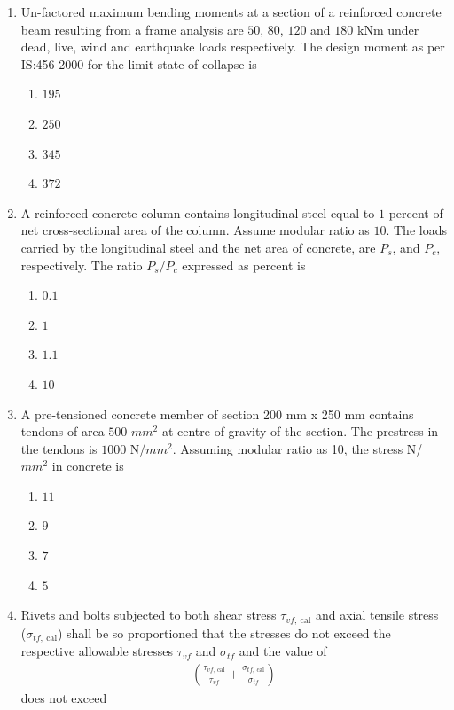 \documentclass[journal]{IEEEtran}
\begin{document}
\begin{enumerate}
\item Un-factored maximum bending moments at a section of a reinforced concrete beam resulting from
a frame analysis are $50$, $80$, $120$ and $180$ kNm under dead, live, wind and earthquake loads
respectively. The design moment  as per IS:456-2000 for the limit state of collapse 
is \hfill {}

\begin{enumerate}
\item $195$
\item $250$
\item $345$
\item $372$
\end{enumerate}

\item A reinforced concrete column contains longitudinal steel equal to $1$ percent of net cross-sectional area of the column. Assume modular ratio as $10$. The loads carried  by the longitudinal steel and the net area of concrete, are $P_s$, and $P_c$, respectively. The ratio $P_s/P_c$ expressed
as percent is \hfill {}

\begin{enumerate}
\item $0.1$
\item $1$
\item $1.1$
\item $10$
\end{enumerate}

\item A pre-tensioned concrete member of section 200 mm x 250 mm contains tendons of area $500$ $mm^{2}$
at centre of gravity of the section. The prestress in the tendons is $1000$ N/$mm^{2}$. Assuming modular
ratio as 10, the stress N/$mm^{2}$ in concrete is \hfill {}

\begin{enumerate}
\item $11$
\item $9$
\item $7$
\item $5$
\end{enumerate}

\item Rivets and bolts subjected to both shear stress $\tau_{vf,\ \text{cal}}$ and axial tensile stress ($\sigma_{tf,\ \text{cal}}$) shall be so proportioned that the stresses do not exceed the respective allowable stresses $\tau_{vf}$ and $\sigma_{tf}$ and the value of
\begin{align}
\left( \frac{\tau_{vf,\ \text{cal}}}{\tau_{vf}} + \frac{\sigma_{tf,\ \text{cal}}}{\sigma_{tf}} \right)
\end{align}
does not exceed \hfill {}


\end{enumerate}
\end{document}
